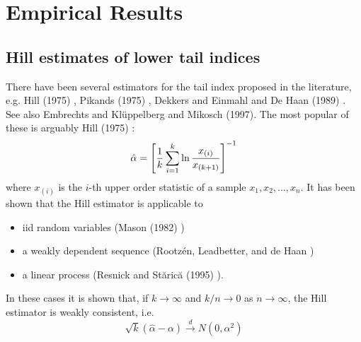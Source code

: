 \documentclass{article}
\begin{document}


\section{Empirical Results}
\subsection{Hill estimates of lower tail indices}
\label{sec:Hill}
There have been several estimators for the tail index proposed in the
literature, e.g. Hill (1975) \cite{hill1975simple}, Pikands (1975)
\cite{pickands1975statistical}, Dekkers and Einmahl and De Haan (1989)
\cite{dekkers1989moment}. See also Embrechts and Kl\"uppelberg and
Mikosch (1997)\cite{Embrechts1997}. The most popular of these is
arguably Hill (1975) \cite{hill1975simple}:
\[
\hat \alpha = \left[
  {1 \over k} \sum_{i=1}^k \ln {x_{(i)} \over x_{(k+1)}}
  \right]^{-1}
\]
where $x_{(i)}$ is the $i$-th upper order statistic of a sample
$x_1, x_2, ..., x_n$. It has been shown that the Hill estimator is
applicable to 
\begin{itemize}
\item iid random variables (Mason (1982) \cite{mason1982laws})
\item a weakly dependent sequence (Rootz{\'e}n, Leadbetter,
  and de Haan \cite{rootzen1992tail})
\item a linear process (Resnick and St{\u{a}}ric{\u{a}} (1995)
  \cite{resnick1995consistency}).
\end{itemize}
In these cases it is shown that, if $k \to \infty$ and $k/n \to 0$
as $n \to \infty$, the Hill estimator is weakly consistent, i.e.
\[
\sqrt k (\hat \alpha - \alpha) \overset{d}{\to} N(0, \alpha^2)
\]
\end{document}
